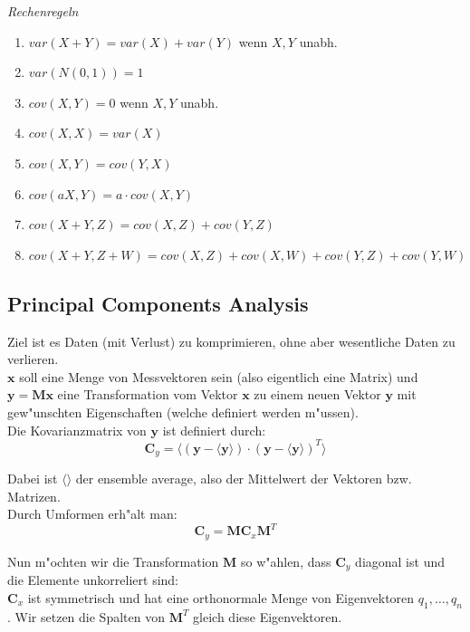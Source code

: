 \documentclass[german, 10pt, a4paper, twocolumn]{scrartcl}
\begin{document}
\textit{Rechenregeln}
\begin{enumerate}
 \item $var(X+Y)=var(X)+var(Y)$ wenn $X,Y$ unabh.
 \item $var(N(0,1))=1$
 \item $cov(X,Y) = 0$ wenn $X,Y$ unabh.
 \item $cov(X,X)=var(X)$
 \item $cov(X,Y)=cov(Y,X)$
 \item $cov(aX,Y)=a\cdotp cov(X,Y)$
 \item $cov(X+Y,Z)=cov(X,Z)+cov(Y,Z)$
 \item $cov(X+Y,Z+W)=cov(X,Z)+cov(X,W)+cov(Y,Z)+cov(Y,W)$
\end{enumerate}

\subsection{Principal Components Analysis}

Ziel ist es Daten (mit Verlust) zu komprimieren, ohne aber wesentliche Daten zu verlieren.\\

$\mathbf{x}$ soll eine Menge von Messvektoren sein (also eigentlich eine Matrix) und $\mathbf{y}=\mathbf{M}\mathbf{x}$ eine Transformation vom Vektor $\mathbf{x}$ zu einem neuen Vektor $\mathbf{y}$ mit gew"unschten Eigenschaften (welche definiert werden m"ussen).\\

Die Kovarianzmatrix von $\mathbf{y}$ ist definiert durch:
\begin{displaymath}
	\mathbf{C}_y = \langle (\mathbf{y}-\langle \mathbf{y} \rangle) \cdotp (\mathbf{y}-\langle \mathbf{y} \rangle)^T\rangle
\end{displaymath}

Dabei ist $\langle \rangle$ der ensemble average, also der Mittelwert der Vektoren bzw. Matrizen.\\

Durch Umformen erh"alt man:
\begin{displaymath}
	\mathbf{C}_y = \mathbf{M} \mathbf{C}_x \mathbf{M}^T
\end{displaymath}

Nun m"ochten wir die Transformation $\mathbf{M}$ so w"ahlen, dass $\mathbf{C}_y$ diagonal ist und die Elemente unkorreliert sind:\\

$\mathbf{C}_x$ ist symmetrisch und hat eine orthonormale Menge von Eigenvektoren $q_1,\ldots,q_n$. Wir setzen die Spalten von $\mathbf{M}^T$ gleich diese Eigenvektoren.
\end{document}
